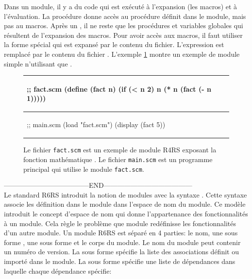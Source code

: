 Dans un module, il y a du code qui est exécuté à l'expansion (les macros) et à
l'évaluation. La procédure  donne accès au
procédure définit dans le module, mais pas au macros.  Après un
, il ne reste que les procédures et variables globales qui
résultent de l'expansion des macros.  Pour avoir accès aux macros, il faut
utiliser la forme spécial  qui est expansé par le contenu du
fichier.  L'expression  est remplacé par le
contenu du fichier . L'exemple \ref{fig:r4rs_fact}
montre un exemple de module simple n'utilisant que .

\begin{figure}[ht]
  \begin{center}
    \begin{tabular}{|l|}
    \hline
    \begin{mplisting}{0.4}
;; fact.scm
(define (fact n)
  (if (< n 2)
    n
    (* n (fact (- n 1)))))
\end{mplisting} \\\hline
    \begin{mplisting}{0.4}
;; main.scm
(load "fact.scm")
(display (fact 5))
\end{mplisting} \\\hline
    \end{tabular}
  \end{center}

  \caption{Le fichier \texttt{fact.scm} est un exemple de module R4RS exposant
  la fonction mathématique . Le fichier \texttt{main.scm} est un
  programme principal qui utilise le module \texttt{fact.scm}.}
  \label{fig:r4rs_fact}
\end{figure}

--------------------------------------END---------------------------------------\\

Le standard R6RS\cite{Scheme:R6RS} introduit la notion de modules avec la
syntaxe . Cette syntaxe associe les définition dans le module
dans l'espace de nom du module. Ce modèle introduit le concept d'espace de nom
qui donne l'appartenance des fonctionnalités à un module. Cela règle le
problème que module redéfinisse les fonctionnalités d'un autre module.  Un
module R6RS est séparé en 4 parties: le nom, une sous forme , une
sous forme  et le corps du module. Le nom du module peut contenir
un numéro de version. La sous forme  spécifie la liste des
associations définit ou importé dans le module. La sous forme 
spécifie une liste de dépendances dans laquelle chaque dépendance spécifie:

